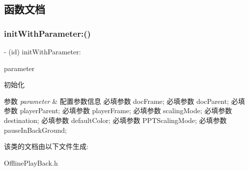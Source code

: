 \subsection{函数文档}
\mbox{\label{interface_offline_play_back_af03e324fc6ecf88ef231c945de5b1a5c}} 
\subsubsection{\texorpdfstring{init\+With\+Parameter\+:()}{initWithParameter:()}}
{\footnotesize\ttfamily -\/ (id) init\+With\+Parameter\+: \begin{DoxyParamCaption}\item[{(\hyperlink{interface_play_parameter}{Play\+Parameter} $\ast$)}]{parameter }\end{DoxyParamCaption}}



初始化 


\begin{DoxyParams}{参数}
{\em parameter} & 配置参数信息 必填参数 doc\+Frame; 必填参数 doc\+Parent; 必填参数 player\+Parent; 必填参数 player\+Frame; 必填参数 scaling\+Mode; 必填参数 destination; 必填参数 default\+Color; 必填参数 P\+P\+T\+Scaling\+Mode; 必填参数 pause\+In\+Back\+Ground; \\
\hline
\end{DoxyParams}


该类的文档由以下文件生成\+:\begin{DoxyCompactItemize}
\item 
Offline\+Play\+Back.\+h\end{DoxyCompactItemize}
